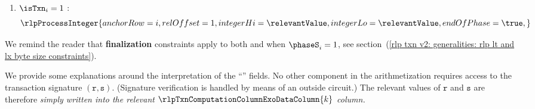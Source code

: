 \begin{center}
\end{center}
\begin{enumerate}
    \item \If $\isTxn _{i} = 1$ \Then:
        \[
            \rlpProcessInteger {
                anchorRow  = i              ,
                relOffset  = 1              ,
                integerHi  = \relevantValue ,
                integerLo  = \relevantValue ,
                endOfPhase = \true          ,
            }
        \]
\end{enumerate}
\saNote{}
We remind the reader that \textbf{finalization} constraints apply to both
\ltByteSizeCountDown{} and
\lxByteSizeCountDown{}
when $\phaseS _{i} = 1$,
see section~(\ref{rlp txn v2: generalities: rlp lt and lx byte size constraints}).

\saNote{}
We provide some explanations around the interpretation of the ``\relevantValue'' fields.
No other component in the arithmetization requires access to the transaction signature $(\texttt{r}, \texttt{s})$.
(Signature verification is handled by means of an outside circuit.)
The relevant values of $\texttt{r}$ and $\texttt{s}$ are therefore \emph{simply written into the relevant $\rlpTxnComputationColumnExoDataColumn{k}$ column.}
